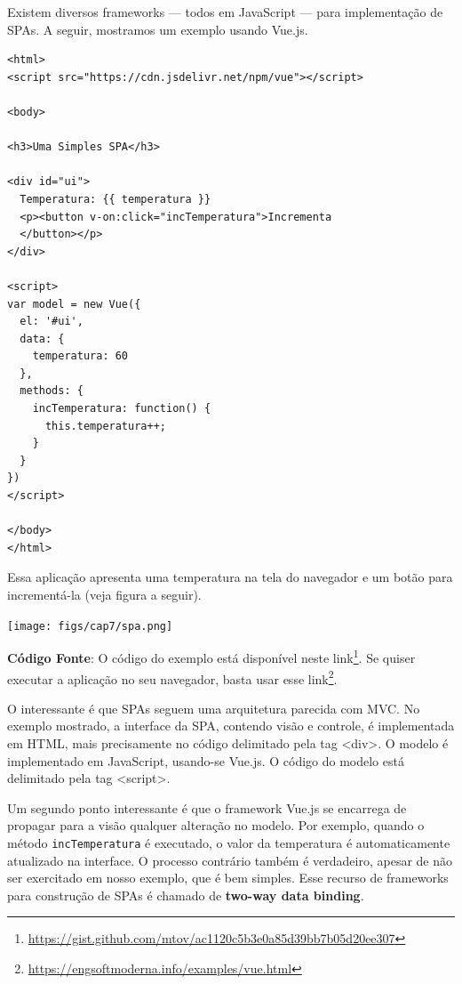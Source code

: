 \documentclass[
  11pt,
  twoside]{book}
\newcommand{\passthrough}[1]{#1}
\DeclareRobustCommand{\href}[2]{#2\footnote{\url{#1}}}
\let\origfigure\figure
\let\endorigfigure\endfigure
\renewenvironment{figure}[1][2] {
    \expandafter\origfigure\expandafter[!h]
} {
    \endorigfigure
}
\begin{document}
  Existem diversos frameworks --- todos
em JavaScript --- para implementação de SPAs. A seguir, mostramos um
exemplo usando Vue.js.

\begin{lstlisting}
<html>
<script src="https://cdn.jsdelivr.net/npm/vue"></script>

<body>

<h3>Uma Simples SPA</h3>

<div id="ui">
  Temperatura: {{ temperatura }}
  <p><button v-on:click="incTemperatura">Incrementa
  </button></p>
</div>

<script>
var model = new Vue({
  el: '#ui',
  data: {
    temperatura: 60
  },
  methods: {
    incTemperatura: function() {
      this.temperatura++;
    }
  }
})
</script>

</body>
</html>
\end{lstlisting}

Essa aplicação apresenta uma temperatura na tela do navegador e um botão
para incrementá-la (veja figura a seguir).

\begin{figure}
\centering
\texttt{[image: figs/cap7/spa.png]}
\caption{Interface da Single-Page Application do exemplo}
\end{figure}

\textbf{Código Fonte}: O código do exemplo está disponível neste
\href{https://gist.github.com/mtov/ac1120c5b3e0a85d39bb7b05d20ee307}{link}.
Se quiser executar a aplicação no seu navegador, basta usar esse
\href{https://engsoftmoderna.info/examples/vue.html}{link}.

O interessante é que SPAs seguem uma arquitetura parecida com MVC. No
exemplo mostrado, a interface da SPA, contendo visão e controle, é
implementada em HTML, mais precisamente no código delimitado pela tag
\textless div\textgreater. O modelo é implementado em JavaScript,
usando-se Vue.js. O código do modelo está delimitado pela tag
\textless script\textgreater.

 Um segundo ponto interessante é que o
framework Vue.js se encarrega de propagar para a visão qualquer
alteração no modelo. Por exemplo, quando o método
\passthrough{\lstinline!incTemperatura!} é executado, o valor da
temperatura é automaticamente atualizado na interface. O processo
contrário também é verdadeiro, apesar de não ser exercitado em nosso
exemplo, que é bem simples. Esse recurso de frameworks para construção
de SPAs é chamado de \textbf{two-way data binding}.
\end{document}
